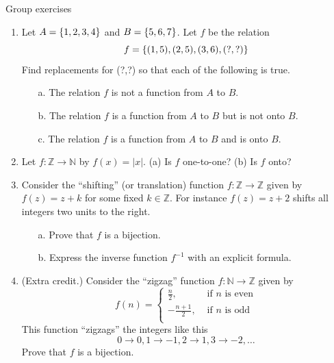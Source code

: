 \documentclass[10pt]{beamer}
\begin{document}
\begin{frame}{Group exercises}
\footnotesize 
\begin{enumerate}
	\item Let $A =\{ {1,2,3,4} \}$ and $B=\{ {5,6,7} \}$.  Let $f$ be the relation
	\[  f=\{ {(1,5),(2,5), (3,6),(?,?)} \}\]
	Find replacements for (?,?) so that each of the following is true.
	\begin{itemize} \footnotesize 
		\item [a.] The relation $f$ is not a function from $A$ to $B$.
		\item [b.] The relation $f$ is a function from $A$ to $B$ but is not onto $B$.
		\item [c.] The relation $f$ is a function from $A$ to $B$ and is onto $B$.
	\end{itemize}
	\item Let $f: \mathbb{Z} \to \mathbb{N}$ by $f(x)=|x|$.   (a) Is $f$ one-to-one? (b) Is $f$ onto?
	\item Consider the \enquote{shifting} (or translation) function $f: \mathbb{Z} \to \mathbb{Z}$ given by $f(z) = z+k$ for some fixed $k \in \mathbb{Z}$.  For instance $f(z) = z+2$ shifts all integers two units to the right.  
	\begin{itemize} \footnotesize 
		\item [a.] Prove that $f$ is a bijection.
		\item [b.] Express the inverse function $f^{-1}$ with an explicit formula.
	\end{itemize} 
	\item (Extra credit.) Consider the \enquote{zigzag} function $f: \mathbb{N} \to \mathbb{Z}$ given by 
	\[ f(n) = 
	\begin{cases}
	\frac{n}{2}, & \text{ if $n$ is even} \\
	-\frac{n+1}{2}, & \text{ if $n$ is odd} \\
	\end{cases}
	\]
	This function \enquote{zigzags} the integers like this
	\[ 0 \to 0, 1 \to -1, 2 \to 1, 3 \to -2, \hdots \]
	Prove that $f$ is a bijection.
\end{enumerate}
\end{frame}
\end{document}
